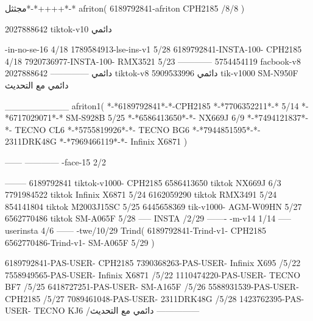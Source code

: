 مجثثل*-*++++*-*
afriton(
6189792841-afriton CPH2185  /8/8
)

2027888642 tiktok-v10
دائمي

-in-no-se-16 4/18
1789584913-lse-ins-v1 5/28
6189792841-INSTA-100- CPH2185 4/18
7920736977-INSTA-100- RMX3521 5/23
------------
5754454119 facbook-v8
دائمي
--------------
2027888642 tiktok-v8
دائمي
5909533996 tik-v1000  SM-N950F
دائمي مع التحديث

__________
afriton1(
*-*6189792841*-*-CPH2185
*-*7706352211*-* 5/14
*-*6717029071*-*  SM-S928B 5/25
*-*6586413650*-*- NX669J  6/9
*-*7494121837*-*-  TECNO CL6  \5
*-*5755819926*-*-   TECNO BG6  \5
*-*7944851595*-*-   2311DRK48G  \5
*-*7969466119*-*-   Infinix X6871  \5
)


------
------------
-face-15 2/2

--------
6189792841 tiktok-v1000- CPH2185 
6586413650 tiktok NX669J  6/3
7791984522 tiktok Infinix X6871   5/24
6162059290 tiktok RMX3491   5/24
854141804 tiktok M2003J15SC   5/25
6445658369 tik-v1000- AGM-W09HN  5/27
6562770486 tiktok  SM-A065F   5/28
-----
 INSTA /2/29
-------
-m-v14 1/14
-----
userinsta 4/6
------
-twe/10/29
Trind(
6189792841-Trind-v1- CPH2185 
6562770486-Trind-v1- SM-A065F   5/29
)

6189792841-PAS-USER- CPH2185 
7390368263-PAS-USER-  Infinix X695  /5/22
7558949565-PAS-USER-  Infinix X6871  /5/22
1110474220-PAS-USER-  TECNO BF7  /5/25
6418727251-PAS-USER-  SM-A165F  /5/26
5588931539-PAS-USER-  CPH2185  /5/27
7089461048-PAS-USER-  2311DRK48G  /5/28
1423762395-PAS-USER- TECNO KJ6  /دائمي مع التحديث
    ---------------

